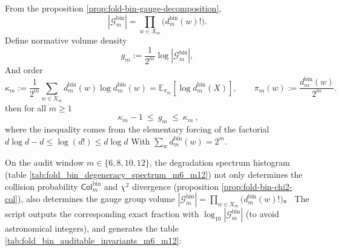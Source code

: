 \begin{proposition}\label{prop:fold-bin-gauge-volume}
From the proposition \ref{prop:fold-bin-gauge-decomposition},
\[
|\mathcal{G}^{\mathrm{bin}}_m|
=\prod_{w\in X_m}\bigl(d^{\mathrm{bin}}_m(w)!\bigr).
\]
Define normative volume density
\[
g_m:=\frac{1}{2^m}\log|\mathcal{G}^{\mathrm{bin}}_m|,
\]
And order
\[
\kappa_m:=\frac{1}{2^m}\sum_{w\in X_m}d^{\mathrm{bin}}_m(w)\log d^{\mathrm{bin}}_m(w)
=\mathbb{E}_{\pi_m}[\log d^{\mathrm{bin}}_m(X)],
\qquad
\pi_m(w):=\frac{d^{\mathrm{bin}}_m(w)}{2^m}.
\]
then for all \(m\ge 1\)
\[
\boxed{\ \kappa_m-1\ \le\ g_m\ \le\ \kappa_m\ },
\]
where the inequality comes from the elementary forcing of the factorial
\(
d\log d-d\le \log(d!)\le d\log d
\)
With \(\sum_w d^{\mathrm{bin}}_m(w)=2^m\).
\end{proposition}

\begin{remark}\label{rem:fold-bin-auditable-invariants}
On the audit window \(m\in\{6,8,10,12\}\), the degradation spectrum histogram (table \ref{tab:fold_bin_degeneracy_spectrum_m6_m12}) not only determines the collision probability
\(\mathsf{Col}^{\mathrm{bin}}_m\) and \(\chi^2\) divergence (proposition \ref{prop:fold-bin-chi2-col}), also determines the gauge group volume
\(
|\mathcal{G}^{\mathrm{bin}}_m|
=\prod_{w\in X_m}\bigl(d^{\mathrm{bin}}_m(w)!\bigr)
\)。
The script \texttt{} outputs the corresponding exact fraction with \(\log_{10}|\mathcal{G}^{\mathrm{bin}}_m|\) (to avoid astronomical integers), and generates the table \ref{tab:fold_bin_auditable_invariants_m6_m12}:

\end{remark}

